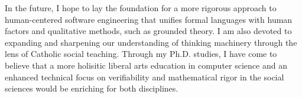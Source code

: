 \documentclass[11pt]{article}
\begin{document}
In the future, I hope to lay the foundation for a more rigorous approach to human-centered software engineering that unifies formal languages with human factors and qualitative methods, such as grounded theory. I am also devoted to expanding and sharpening our understanding of thinking machinery through the lens of Catholic social teaching. Through my Ph.D. studies, I have come to believe that a more holisitic liberal arts education in computer science and an enhanced technical focus on verifiability and mathematical rigor in the social sciences would be enriching for both disciplines.
\end{document}
